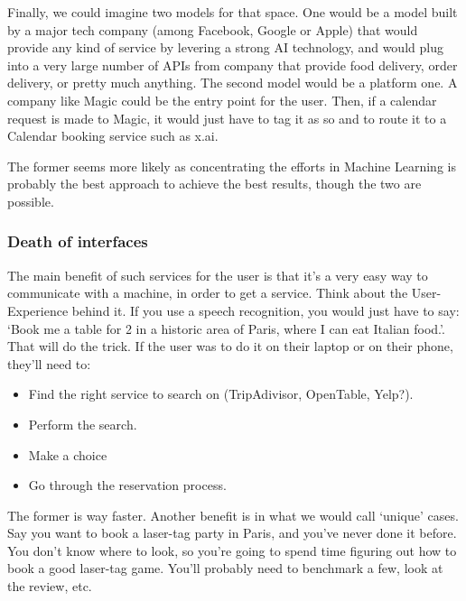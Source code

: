 \documentclass[12pt]{article}
\begin{document}
Finally, we could imagine two models for that space.
One would be a model built by a major tech company (among Facebook, Google or
Apple) that would provide any kind of service by levering a strong AI
technology, and would plug into a very large number of APIs from company that
provide food delivery, order delivery, or pretty much anything.
The second model would be a platform one. A company like Magic could be the
entry point for the user. Then, if a calendar request is made to Magic, it would
just have to tag it as so and to route it to a Calendar booking service such as
x.ai.

The former seems more likely as concentrating the efforts in Machine Learning is
probably the best approach to achieve the best results, though the two are
possible.

\subsubsection{Death of interfaces}

The main benefit of such services for the user is that it's a very easy way to
communicate with a machine, in order to get a service. Think about the
User-Experience behind it. If you use a speech recognition, you would just
have to say: \lq Book me a table for 2 in a historic area of Paris, where I
can eat Italian
food.\rq. That will do the trick.
If the user was to do it on their laptop or on their phone, they'll need to:
\begin{itemize}
  \item Find the right service to search on (TripAdivisor, OpenTable, Yelp?).
  \item Perform the search.
  \item Make a choice
  \item Go through the reservation process.
\end{itemize}

The former is way faster. Another benefit is in what we would call \lq unique\rq
cases. Say you want to book a laser-tag party in Paris, and you've never done it
before. You don't know where to look, so you're going to spend time figuring out
how to book a good laser-tag game. You'll probably need to benchmark a few,
look at the review, etc.
\end{document}
